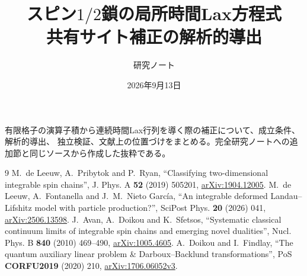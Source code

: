 \documentclass[a4paper,11pt]{ltjsarticle}
\title{スピン$1/2$鎖の局所時間Lax方程式\\共有サイト補正の解析的導出}
\author{研究ノート}
\date{2026年9月13日}
\numberwithin{equation}{section}
\begin{document}
\maketitle
\noindent
有限格子の演算子積から連続時間Lax行列を導く際の補正について、成立条件、解析的導出、
独立検証、文献上の位置づけをまとめる。完全研究ノートへの追加節と同じソースから作成した抜粋である。

\clearpage
\begin{thebibliography}{9}
 M.~de Leeuw, A.~Pribytok and P.~Ryan,
``Classifying two-dimensional integrable spin chains'',
J. Phys. A \textbf{52} (2019) 505201,
\href{https://arxiv.org/abs/1904.12005}{arXiv:1904.12005}.
 M.~de Leeuw, A.~Fontanella and J.~M.~Nieto Garc\'ia,
``An integrable deformed Landau--Lifshitz model with particle production?'',
SciPost Phys. \textbf{20} (2026) 041,
\href{https://arxiv.org/abs/2506.13598}{arXiv:2506.13598}.
 J.~Avan, A.~Doikou and K.~Sfetsos,
``Systematic classical continuum limits of integrable spin chains and emerging novel dualities'',
Nucl. Phys. B \textbf{840} (2010) 469--490,
\href{https://arxiv.org/abs/1005.4605}{arXiv:1005.4605}.
 A.~Doikou and I.~Findlay,
``The quantum auxiliary linear problem \& Darboux--Backlund transformations'',
PoS \textbf{CORFU2019} (2020) 210,
\href{https://arxiv.org/abs/1706.06052v3}{arXiv:1706.06052v3}.
\end{thebibliography}
\end{document}
